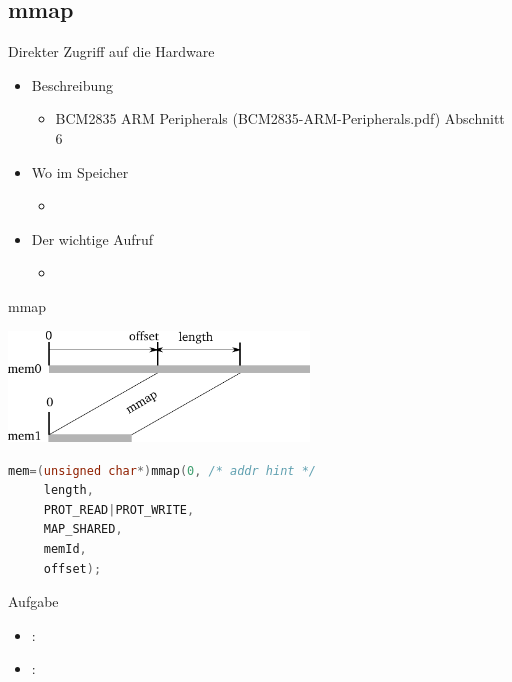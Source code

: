 \documentclass{beamer}
\begin{document}
\subsection{mmap}
\begin{frame}{}{Direkter Zugriff auf die Hardware}
 \begin{itemize}
  \item Beschreibung
   \begin{itemize}
    \item BCM2835 ARM Peripherals (BCM2835-ARM-Peripherals.pdf) Abschnitt 6
   \end{itemize}
  \item Wo im Speicher
   \begin{itemize}
    \item {}
   \end{itemize}
 \item Der wichtige Aufruf
  \begin{itemize}
   \item {}
  \end{itemize}
 \end{itemize}
\end{frame}

\begin{frame}[fragile]{mmap}
\begin{center}
 \includegraphics[width=8cm]{mmap.pdf}
\end{center}
\begin{lstlisting}[language=C]
 mem=(unsigned char*)mmap(0, /* addr hint */
     length,
     PROT_READ|PROT_WRITE,
     MAP_SHARED, 
     memId,
     offset);
\end{lstlisting}
\end{frame}

\begin{frame}{Aufgabe}
 \begin{itemize}
  \item {}:  
  \item {}: 
 \end{itemize}
\end{frame}
\end{document}

